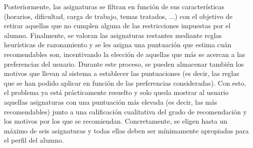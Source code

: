 Posteriormente, las asignaturas se filtran en función de sus características 
(horarios, dificultad, carga de trabajo, temas tratados, ...) con el objetivo 
de retirar aquellas que no cumplen alguna de las restricciones impuestas por 
el alumno. Finalmente, se valoran las asignaturas restantes mediante reglas 
heurísticas de razonamiento y se les asigna una puntuación que estima cuán 
recomendables son, incentivando la elección de aquellas que más se acercan 
a las preferencias del usuario. Durante este proceso, se pueden almacenar 
también los motivos que llevan al sistema a establecer las puntuaciones (es 
decir, las reglas que se han podido aplicar en función de las preferencias 
consideradas). Con esto, el problema ya está prácticamente resuelto y solo 
queda mostrar al usuario aquellas asignaturas con una puntuación más elevada 
(es decir, las más recomendables) junto a una calificación cualitativa del 
grado de recomendación y los motivos por los que se recomiendan. 
Concretamente, se eligen hasta un máximo de seis asignaturas y todas ellas 
deben ser mínimamente apropiadas para el perfil del alumno.



